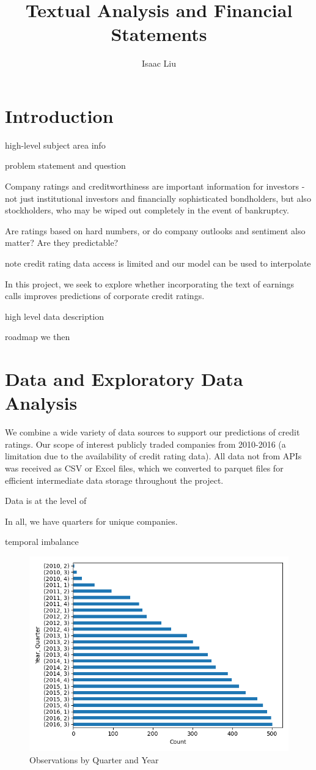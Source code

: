 \documentclass{article}
\title{Textual Analysis and Financial Statements}
\author{Isaac Liu}
\begin{document}
	\maketitle

    \section*{Introduction}

    high-level subject area info

    \citep{das_credit_2023}

    problem statement and question

    Company ratings and creditworthiness are important information for investors - not just institutional investors and financially sophisticated bondholders, but also stockholders, who may be wiped out completely in the event of bankruptcy.

    Are ratings based on hard numbers, or do company outlooks and sentiment also matter? Are they predictable?

    note credit rating data access is limited and our model can be used to interpolate

    In this project, we seek to explore whether incorporating the text of earnings calls improves predictions of corporate credit ratings.

    high level data description

    roadmap
    we then

    \section*{Data and Exploratory Data Analysis}

    We combine a wide variety of data sources to support our predictions of credit ratings. Our scope of interest publicly traded companies from 2010-2016 (a limitation due to the availability of credit rating data). All data not from APIs was received as CSV or Excel files, which we converted to parquet files for efficient intermediate data storage throughout the project.

    Data is at the level of

    In all, we have \numQuarters \space quarters for \numCompanies \space unique companies.

    temporal imbalance

    \begin{figure}[h!]
		\centering
        \caption{Observations by Quarter and Year}
        \includegraphics[width=0.5\linewidth,keepaspectratio=true]{../Output/All Data EDA/Tabular EDA/all_data_fixed_quarter_dates_obs_by_year_quarter_no_title.png}
	\end{figure}
\end{document}
